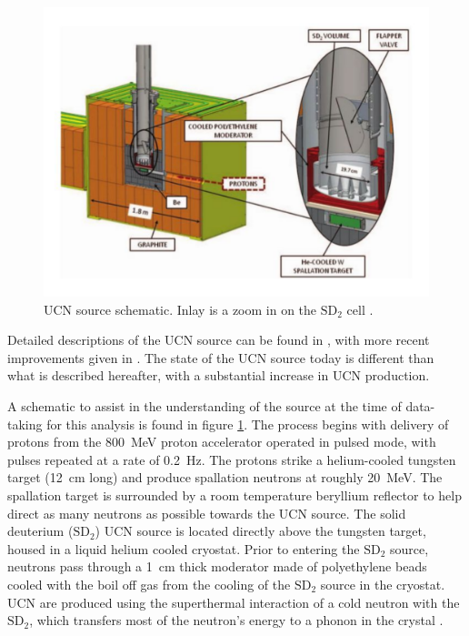 \begin{figure}[h]
  \centering
  \includegraphics[scale=0.48]{2-UCNAExperiment/source_figure.pdf} 
  \caption{UCN source schematic. Inlay is a zoom in on the
    $\mathrm{SD}_2$ cell \cite{saunders2013performance}.}
  \label{fig:sourceFig}
\end{figure}

Detailed descriptions of the UCN source can be found in
\cite{saunders2004demonstration,morris2002measurements,saunders2013performance}, with
more recent improvements given in \cite{ito2017performance}. The state of the
UCN source today is different than what is described hereafter, with a substantial
increase in UCN production.

A schematic to assist in the understanding of the source at the time of data-taking
for this analysis is found in figure
\ref{fig:sourceFig}. The process begins with delivery of protons from the 800~MeV proton
accelerator operated in pulsed mode, with pulses repeated at a rate of 0.2~Hz.
The protons strike a helium-cooled tungsten target (12~cm long) and produce
spallation neutrons at roughly 20~MeV. The spallation target is surrounded by
a room temperature beryllium reflector to help direct as many neutrons as
possible towards the UCN source. The solid deuterium ($\mathrm{SD}_2$) UCN source
is located directly above the tungsten target, housed in a liquid helium
cooled cryostat. Prior to entering the $\mathrm{SD}_2$ source, neutrons
pass through a 1~cm thick moderator made of polyethylene beads cooled with the boil off gas
from the cooling of the $\mathrm{SD}_2$ source in the cryostat.
UCN are produced using the superthermal interaction of a cold neutron with the $\mathrm{SD}_2$,
which transfers most of the neutron's energy to a phonon in the crystal \cite{golub1991ultra}.

